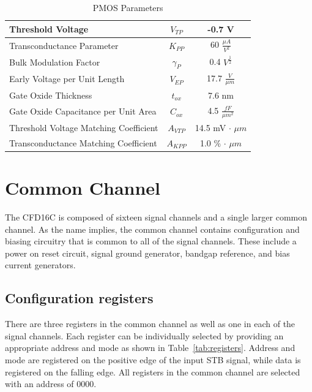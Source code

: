 \documentclass[12pt,oneside,final]{siuethesis}
\theoremstyle{definition}
\begin{document}
 
\begin{table} [htbp!]
\begin{center}
\begin{tabular}{| l | c | c |}
\hline 
Threshold Voltage & $V_{TP}$ & -0.7 V \\ 
\hline 
Transconductance Parameter & $K_{PP}$  &  60 $\frac{\mu A}{V^2}$ \\ 
\hline 
Bulk Modulation Factor & $\gamma_{P}$  &  0.4 $V^{\frac{1}{2}}$ \\ 
\hline 
Early Voltage per Unit Length & $V_{EP}$  &  17.7 $\frac{V}{\mu m}$ \\ 
\hline 
Gate Oxide Thickness & $t_{ox}$  &  7.6 nm \\ 
\hline 
Gate Oxide Capacitance per Unit Area & $C_{ox}$  &  4.5 $\frac{fF}{\mu m^2}$ \\ 
\hline 
Threshold Voltage Matching Coefficient & $A_{VTP}$  &  14.5 mV $\cdot$ $\mu m$ \\ 
\hline 
Transconductance Matching Coefficient & $A_{KPP}$  &  1.0 \% $\cdot$ $\mu m$ \\ 
\hline 
\end{tabular} 
\end{center}
\caption{PMOS Parameters}
\label{TBL:PMOS_PARMS}
\end{table}


\section{Common Channel}
\par The CFD16C is composed of sixteen signal channels and a single larger common channel. As the name implies, the common channel contains configuration and biasing circuitry that is common to all of the signal channels. These include a power on reset circuit, signal ground generator, bandgap reference, and bias current generators.

\subsection{Configuration registers}
\par There are three registers in the common channel as well as one in each of the signal channels. Each register can be individually selected by providing an appropriate address and mode as shown in Table~\ref{tab:registers}. Address and mode are registered on the positive edge of the input STB signal, while data is registered on the falling edge. All registers in the common channel are selected with an address of 0000. 
\end{document}
